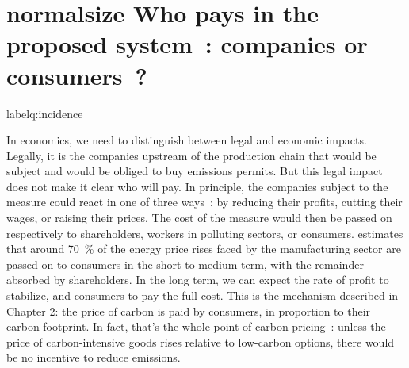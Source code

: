 \documentclass[a5paper,french,openany]{memoir}
\begin{document}
\section*{normalsize Who pays in the proposed system~: companies or consumers~?}label{q:incidence}

In economics, we need to distinguish between legal and economic impacts. Legally, it is the companies upstream of the production chain that would be subject and would be obliged to buy emissions permits. But this legal impact does not make it clear who will pay. In principle, the companies subject to the measure could react in one of three ways~: by reducing their profits, cutting their wages, or raising their prices. The cost of the measure would then be passed on respectively to shareholders, workers in polluting sectors, or consumers. \cite{ganapati_energy_2020} estimates that around 70~\% of the energy price rises faced by the manufacturing sector are passed on to consumers in the short to medium term, with the remainder absorbed by shareholders. In the long term, we can expect the rate of profit to stabilize, and consumers to pay the full cost. This is the mechanism described in Chapter 2: the price of carbon is paid by consumers, in proportion to their carbon footprint. In fact, that's the whole point of carbon pricing~: unless the price of carbon-intensive goods rises relative to low-carbon options, there would be no incentive to reduce emissions.
\end{document}
